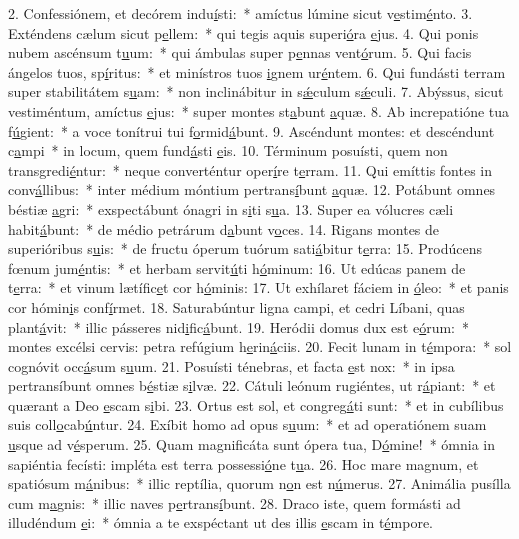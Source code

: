 2. Confessiónem, et decórem indu\uline{í}sti:~* amíctus lúmine sicut v\uline{e}stim\uline{é}nto.
3. Exténdens cælum sicut p\uline{e}llem:~* qui tegis aquis superi\uline{ó}ra \uline{e}jus.
4. Qui ponis nubem ascénsum t\uline{u}um:~* qui ámbulas super p\uline{e}nnas vent\uline{ó}rum.
5. Qui facis ángelos tuos, sp\uline{í}ritus:~* et minístros tuos \uline{i}gnem ur\uline{é}ntem.
6. Qui fundásti terram super stabilitátem s\uline{u}am:~* non inclinábitur in s\uline{ǽ}culum s\uline{ǽ}culi.
7. Abýssus, sicut vestiméntum, amíctus \uline{e}jus:~* super montes st\uline{a}bunt \uline{a}quæ.
8. Ab increpatióne tua f\uline{ú}gient:~* a voce tonítrui tui f\uline{o}rmid\uline{á}bunt.
9. Ascéndunt montes: et descéndunt c\uline{a}mpi~* in locum, quem fund\uline{á}sti \uline{e}is.
10. Términum posuísti, quem non transgredi\uline{é}ntur:~* neque converténtur oper\uline{í}re t\uline{e}rram.
11. Qui emíttis fontes in conv\uline{á}llibus:~* inter médium móntium pertrans\uline{í}bunt \uline{a}quæ.
12. Potábunt omnes béstiæ \uline{a}gri:~* exspectábunt ónagri in s\uline{i}ti s\uline{u}a.
13. Super ea vólucres cæli habit\uline{á}bunt:~* de médio petrárum d\uline{a}bunt v\uline{o}ces.
14. Rigans montes de superióribus s\uline{u}is:~* de fructu óperum tuórum sati\uline{á}bitur t\uline{e}rra:
15. Prodúcens fœnum jum\uline{é}ntis:~* et herbam servit\uline{ú}ti h\uline{ó}minum:
16. Ut edúcas panem de t\uline{e}rra:~* et vinum lætífic\uline{e}t cor h\uline{ó}minis:
17. Ut exhílaret fáciem in \uline{ó}leo:~* et panis cor hómin\uline{i}s conf\uline{í}rmet.
18. Saturabúntur ligna campi, et cedri Líbani, quas plant\uline{á}vit:~* illic pásseres nid\uline{i}fic\uline{á}bunt.
19. Heródii domus dux est e\uline{ó}rum:~* montes excélsi cervis: petra refúgium h\uline{e}rin\uline{á}ciis.
20. Fecit lunam in t\uline{é}mpora:~* sol cognóvit occ\uline{á}sum s\uline{u}um.
21. Posuísti ténebras, et facta \uline{e}st nox:~* in ipsa pertransíbunt omnes b\uline{é}stiæ s\uline{i}lvæ.
22. Cátuli leónum rugiéntes, ut r\uline{á}piant:~* et quærant a Deo \uline{e}scam s\uline{i}bi.
23. Ortus est sol, et congreg\uline{á}ti sunt:~* et in cubílibus suis coll\uline{o}cab\uline{ú}ntur.
24. Exíbit homo ad opus s\uline{u}um:~* et ad operatiónem suam \uline{u}sque ad v\uline{é}sperum.
25. Quam magnificáta sunt ópera tua, D\uline{ó}mine!~* ómnia in sapiéntia fecísti: impléta est terra possessi\uline{ó}ne t\uline{u}a.
26. Hoc mare magnum, et spatiósum m\uline{á}nibus:~* illic reptília, quorum n\uline{o}n est n\uline{ú}merus.
27. Animália pusílla cum m\uline{a}gnis:~* illic naves p\uline{e}rtrans\uline{í}bunt.
28. Draco iste, quem formásti ad illudéndum \uline{e}i:~* ómnia a te exspéctant ut des illis \uline{e}scam in t\uline{é}mpore.
